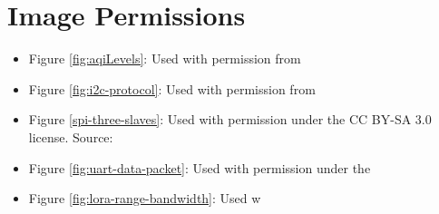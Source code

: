 \section{Image Permissions}


\begin{itemize}
\item Figure \ref{fig:aqiLevels}: Used with permission from

\item Figure \ref{fig:i2c-protocol}: Used with permission from \cite{i2c-protocol}

\item Figure \ref{spi-three-slaves}: Used with permission under the CC BY-SA 3.0 license. Source: 

\item Figure \ref{fig:uart-data-packet}: Used with permission under the

\item Figure \ref{fig:lora-range-bandwidth}: Used w
\end{itemize}